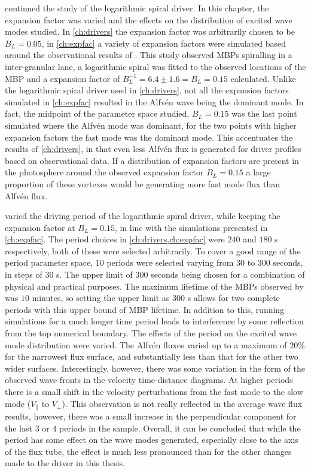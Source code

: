 \documentclass[a4paper,12pt,fourier,authoryear,custommargin]{Classes/PhDThesisPSnPDF}
\begin{document}
 continued the study of the logarithmic spiral driver.
In this chapter, the expansion factor was varied and the effects on the distribution of excited wave modes studied.
In \cref{ch:drivers} the expansion factor was arbitrarily chosen to be $B_L = 0.05$, in \cref{ch:expfac} a variety of expansion factors were simulated based around the observational results of \cite{bonet2008}.
This study observed MBPs spiralling in a inter-granular lane, a logarithmic spiral was fitted to the observed locations of the MBP and a expansion factor of $B_L^{-1} = 6.4 \pm 1.6 = B_L = 0.15$ calculated.
Unlike the logarithmic spiral driver used in \cref{ch:drivers}, not all the expansion factors simulated in \cref{ch:expfac} resulted in the Alfv\'en wave being the dominant mode.
In fact, the midpoint of the parameter space studied, $B_L = 0.15$ was the last point simulated where the Alfv\'en mode was dominant, for the two points with higher expansion factors the fast mode was the dominant mode.
This accentuates the results of \cref{ch:drivers}, in that even less Alfv\'en flux is generated for driver profiles based on observational data.
If a distribution of expansion factors are present in the photosphere around the observed expansion factor $B_L = 0.15$ a large proportion of these vortexes would be generating more fast mode flux than Alfv\'en flux.

 varied the driving period of the logarithmic spiral driver, while keeping the expansion factor at $B_L = 0.15$, in line with the simulations presented in \cref{ch:expfac}.
The period choices in \cref{ch:drivers,ch:expfac} were $240$ and $180$ s respectively, both of these were selected arbitrarily.
To cover a good range of the period parameter space, $10$ periods were selected varying from $30$ to $300$ seconds, in steps of $30$ s.
The upper limit of $300$ seconds being chosen for a combination of physical and practical purposes.
The maximum lifetime of the MBPs observed by \cite{sanchezalmeida2004} was $10$ minutes, so setting the upper limit as $300$ s allows for two complete periods with this upper bound of MBP lifetime.
In addition to this, running simulations for a much longer time period leads to interference by some reflection from the top numerical boundary.
The effects of the period on the excited wave mode distribution were varied.
The Alfv\'en fluxes varied up to a maximum of $20$\% for the narrowest flux surface, and substantially less than that for the other two wider surfaces.
Interestingly, however, there was some variation in the form of the observed wave fronts in the velocity time-distance diagrams.
At higher periods there is a small shift in the velocity perturbations from the fast mode to the slow mode ($V_\parallel$ to $V_\perp$).
This observation is not really reflected in the average wave flux results, however, there was a small increase in the perpendicular component for the last $3$ or $4$ periods in the sample.
Overall, it can be concluded that while the period has some effect on the wave modes generated, especially close to the axis of the flux tube, the effect is much less pronounced than for the other changes made to the driver in this thesis.
\end{document}
